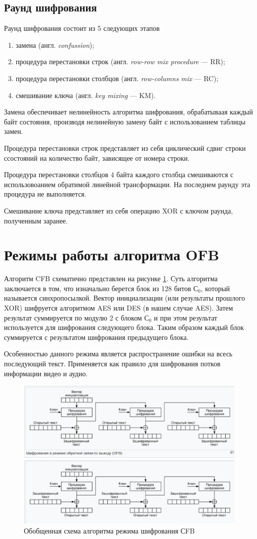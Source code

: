 \subsection{Раунд шифрования}

Раунд шифрования состоит из 5 следующих этапов
\begin{enumerate}[label=\arabic*)]
	\item замена (англ. \textit{confussion});
	\item процедура перестановки строк (англ. \textit{row-row mix procedure} --- RR);
	\item процедура перестановки столбцов (англ. \textit{row-columns mix} --- RC);
	\item смешивание ключа (англ. \textit{key mixing} --- KM).
\end{enumerate}

Замена обеспечивает нелинейность алгоритма шифрования, обрабатываая каждый байт состояния, производя нелинейную замену байт с использованием таблицы замен.

Процедура перестановки строк представляет из себя циклический сдвиг строки ссостояний на количество байт, зависящее от номера строки.

Процедура перестановки столбцов 4 байта каждого столбца смешиваются с использовоанием обратимой линейной трансформации. На последнем раунду эта процедура не выполняется.

Смешивание ключа представляет из себя операцию XOR с ключом раунда, полученным заранее.

\section{Режимы работы алгоритма OFB}

Алгоритм CFB схематично представлен на рисунке \ref{fig:cfb}.
Суть алгоритма заключается в том, что изначально берется блок из 128 битов \(С_0\), который называется синхропосылкой. 
Вектор инициализации (или результаты прошлого XOR) шифруется алгоритмом AES или DES (в нашем случае AES). 
Затем результат суммируется по модулю 2 с блоком \(С_0\) и при этом результат используется для шифрования следующего блока.
Таким образом каждый блок суммируется с результатом шифрования предыдущего блока.

Особенностью данного режима является распространение ошибки на всесь последующий текст.
Применяется как правило для шифрования потков информации видео и аудио.

\begin{figure}[ht!]
	\centering
	\includegraphics[width=0.9\linewidth]{img/cfb.png}
	\caption{Обобщенная схема алгоритма режима шифрования СFB}
	\label{fig:cfb}
\end{figure}